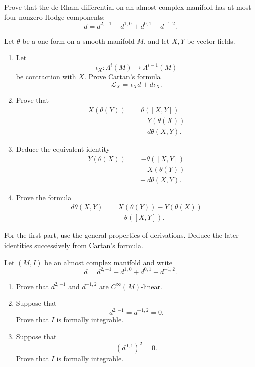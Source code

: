 \begin{exercise}
\label{exercise-four-hodge-components}
Prove that the de Rham differential on an
almost complex manifold has at most four
nonzero Hodge components:
$$
d=d^{2,-1}+d^{1,0}+d^{0,1}+d^{-1,2}.
$$
\end{exercise}

\begin{exercise}
\label{exercise-cartan-formulas}
Let $\theta$ be a one-form on a smooth
manifold $M$, and let $X,Y$ be vector
fields.

\begin{enumerate}
\item Let
$$
\iota_X:\Lambda^i(M)
\longrightarrow\Lambda^{i-1}(M)
$$
be contraction with $X$. Prove Cartan's
formula
$$
\mathcal{L}_X=\iota_Xd+d\iota_X.
$$

\item Prove that
$$
\begin{aligned}
X(\theta(Y))
&=\theta([X,Y])\\
&\quad+Y(\theta(X))\\
&\quad+d\theta(X,Y).
\end{aligned}
$$

\item Deduce the equivalent identity
$$
\begin{aligned}
Y(\theta(X))
&=-\theta([X,Y])\\
&\quad+X(\theta(Y))\\
&\quad-d\theta(X,Y).
\end{aligned}
$$

\item Prove the formula
$$
\begin{aligned}
d\theta(X,Y)
&=X(\theta(Y))-Y(\theta(X))\\
&\quad-\theta([X,Y]).
\end{aligned}
$$
\end{enumerate}
\end{exercise}

For the first part, use the general
properties of derivations. Deduce the later
identities successively from Cartan's
formula.

\begin{exercise}
\label{exercise-integrability-components}
Let $(M,I)$ be an almost complex manifold
and write
$$
d=d^{2,-1}+d^{1,0}+d^{0,1}+d^{-1,2}.
$$

\begin{enumerate}
\item Prove that $d^{2,-1}$ and
$d^{-1,2}$ are $C^\infty(M)$-linear.

\item Suppose that
$$
d^{2,-1}=d^{-1,2}=0.
$$
Prove that $I$ is formally integrable.

\item Suppose that
$$
(d^{0,1})^2=0.
$$
Prove that $I$ is formally integrable.
\end{enumerate}
\end{exercise}

